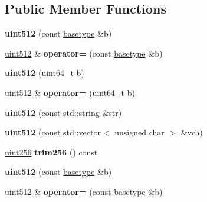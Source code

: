 \subsection*{Public Member Functions}
\begin{DoxyCompactItemize}
\item 
\mbox{\label{classuint512_ac393025f666e5107b088186888f58b77}} 
{\bfseries uint512} (const \mbox{\hyperlink{classbase__uint}{basetype}} \&b)
\item 
\mbox{\label{classuint512_ad411ae132d25064a6ea1d300d72ffd32}} 
\mbox{\hyperlink{classuint512}{uint512}} \& {\bfseries operator=} (const \mbox{\hyperlink{classbase__uint}{basetype}} \&b)
\item 
\mbox{\label{classuint512_a9b0342e991f4a3f858c9744a671b83d2}} 
{\bfseries uint512} (uint64\+\_\+t b)
\item 
\mbox{\label{classuint512_a9a469563507cf8ffbdf369b2c985e016}} 
\mbox{\hyperlink{classuint512}{uint512}} \& {\bfseries operator=} (uint64\+\_\+t b)
\item 
\mbox{\label{classuint512_a407d2a7a59005a57e848327014c7d2b5}} 
{\bfseries uint512} (const std\+::string \&str)
\item 
\mbox{\label{classuint512_a017c6e9933a94a0d9b2eb2fff280065a}} 
{\bfseries uint512} (const std\+::vector$<$ unsigned char $>$ \&vch)
\item 
\mbox{\label{classuint512_a90ae45972cae81e4e2d941ebe927b65c}} 
\mbox{\hyperlink{classuint256}{uint256}} {\bfseries trim256} () const
\item 
\mbox{\label{classuint512_ac393025f666e5107b088186888f58b77}} 
{\bfseries uint512} (const \mbox{\hyperlink{classbase__uint}{basetype}} \&b)
\item 
\mbox{\label{classuint512_ad411ae132d25064a6ea1d300d72ffd32}} 
\mbox{\hyperlink{classuint512}{uint512}} \& {\bfseries operator=} (const \mbox{\hyperlink{classbase__uint}{basetype}} \&b)
\item 
\mbox{\label{classuint512_af330838aeac8ae45883f18de5b431c0f}} 

\end{DoxyCompactItemize}

